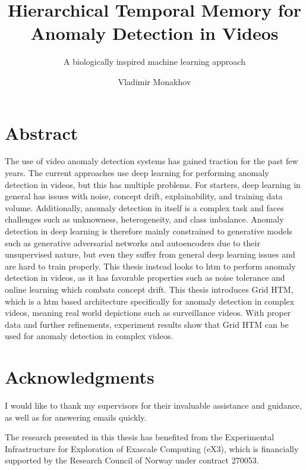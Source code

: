 \documentclass[USenglish]{ifimaster}  %
\title{Hierarchical Temporal Memory for Anomaly Detection in Videos}
\subtitle{A biologically inspired machine learning approach }         %
\author{Vladimir Monakhov}                      %
\begin{document}
\duoforside[
  dept={Department of Informatics},   %
  program={Informatics: Robotics and Intelligent Systems},         %
  long
]                                        %

\frontmatter{}
\chapter*{Abstract} 
The use of video anomaly detection systems has gained traction for the past few years. The current approaches use deep learning for performing anomaly detection in videos, but this has multiple problems. For starters, deep learning in general has issues with noise, concept drift, explainability, and training data volume. Additionally, anomaly detection in itself is a complex task and faces challenges such as unknowness, heterogeneity, and class imbalance. Anomaly detection in deep learning is therefore mainly constrained to generative models such as generative adversarial networks and autoencoders due to their unsupervised nature, but even they suffer from general deep learning issues and are hard to train properly. This thesis instead looks to \gls*{htm} to perform anomaly detection in videos, as it has favorable properties such as noise tolerance and online learning which combats concept drift. This thesis introduces Grid HTM, which is a \gls*{htm} based architecture specifically for anomaly detection in complex videos, meaning real world depictions such as surveillance videos. With proper data and further refinements, experiment results show that Grid HTM can be used for anomaly detection in complex videos.

\chapter*{Acknowledgments} 
I would like to thank my supervisors for their invaluable assistance and guidance, as well as for answering emails quickly.
\par
The research presented in this thesis has benefited from the Experimental Infrastructure for Exploration of Exascale Computing (eX3), which is financially supported by the Research Council of Norway under contract 270053.

\tableofcontents
\listoffigures
\listoftables
\mainmatter{}
\glsresetall





\backmatter{}
\printbibliography
\end{document}
